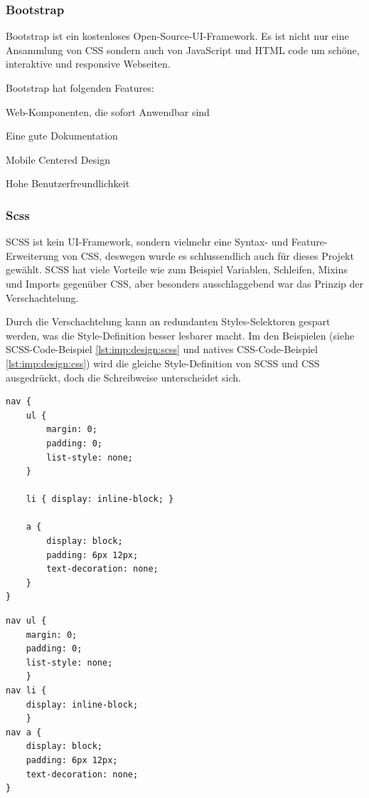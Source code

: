\subsubsection{Bootstrap}
Bootstrap ist ein kostenloses Open-Source-UI-Framework. Es ist nicht nur eine Ansammlung von CSS sondern auch von JavaScript und HTML code um schöne, interaktive und responsive Webseiten.  \cite{BestCSSFrameworksin2022}

Bootstrap hat folgenden Features:  \cite{BestCSSFrameworksin2022}
\begin{compactitem}
    \item Web-Komponenten, die sofort Anwendbar sind
    \item Eine gute Dokumentation
    \item Mobile Centered Design
    \item Hohe Benutzerfreundlichkeit
\end{compactitem}

\subsubsection{Scss}
SCSS ist kein UI-Framework, sondern vielmehr eine Syntax- und Feature-Erweiterung von CSS, deswegen wurde es schlussendlich auch für dieses Projekt gewählt. SCSS hat viele Vorteile wie zum Beispiel Variablen, Schleifen, Mixins und Imports gegenüber CSS, aber besonders ausschlaggebend war das Prinzip der Verschachtelung. \cite[Sass Guide]{SassGuide}

Durch die Verschachtelung kann an redundanten Styles-Selektoren gespart werden, was die Style-Definition besser lesbarer macht. Im den Beispielen (siehe SCSS-Code-Beispiel \ref{lst:imp:design:scss} und natives CSS-Code-Beispiel \ref{lst:imp:design:css}) wird die gleiche Style-Definition von SCSS und CSS ausgedrückt, doch die Schreibweise unterscheidet sich. \cite[Sass Guide]{SassGuide}

\cite[Sass Guide]{SassGuide}


\begin{lstlisting}[caption=SCSS - Code Beispiel,label=lst:imp:design:scss]
nav {
    ul {
        margin: 0;
        padding: 0;
        list-style: none;
    }
    
    li { display: inline-block; }
    
    a {
        display: block;
        padding: 6px 12px;
        text-decoration: none;
    }
}
\end{lstlisting}

\begin{lstlisting}[caption=CSS - Code Beispiel,label=lst:imp:design:css]
nav ul {
    margin: 0;
    padding: 0;
    list-style: none;
    }
nav li {
    display: inline-block;
    }
nav a {
    display: block;
    padding: 6px 12px;
    text-decoration: none;
}
\end{lstlisting}

